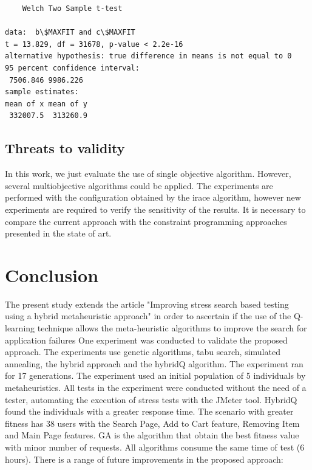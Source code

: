 \documentclass[espaco=umemeio,chapter=TITLE,twoside,openright]{abnt}
\begin{document}
\begin{lstlisting}
	Welch Two Sample t-test

data:  b\$MAXFIT and c\$MAXFIT
t = 13.829, df = 31678, p-value < 2.2e-16
alternative hypothesis: true difference in means is not equal to 0
95 percent confidence interval:
 7506.846 9986.226
sample estimates:
mean of x mean of y 
 332007.5  313260.9 

\end{lstlisting}



\subsection{Threats to validity}

In this work, we just evaluate the use of single objective algorithm. However, several multiobjective algorithms could be applied.  The experiments are performed with the configuration obtained by the irace algorithm, however new experiments are required to verify the sensitivity of the results. It is necessary to compare the current approach with the constraint programming approaches presented in the state of art.



\section{Conclusion}

The present study extends the article "Improving stress search based testing using a hybrid metaheuristic approach" in order to ascertain if the use of the Q-learning technique allows the meta-heuristic algorithms to improve the search for application failures One experiment was conducted to validate the proposed approach. The experiments use genetic algorithms, tabu search, simulated annealing, the hybrid approach and the hybridQ algorithm. The experiment ran for 17 generations. The experiment used an initial population of 5 individuals by metaheuristics. All tests in the experiment were conducted without the need of a tester, automating the execution of stress tests with the JMeter tool.  HybridQ found the individuals with a greater response time. The scenario with greater fitness has 38 users with the Search Page, Add to Cart feature, Removing Item and Main Page features. GA is the algorithm that obtain the best fitness value with minor number of requests. All algorithms consume the same time of test (6 hours). There is a range of future improvements in the proposed approach:
\end{document}
